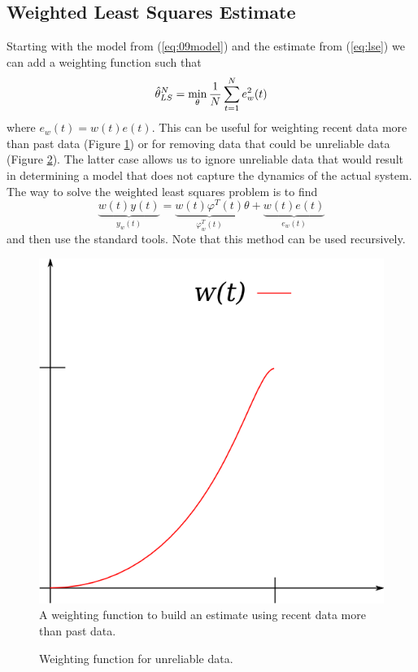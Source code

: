 \subsection{Weighted Least Squares Estimate}
Starting with the model from (\ref{eq:09model}) and the estimate from (\ref{eq:lse}) we can add a weighting function such that
$$\hat{\theta}_{LS}^N = \min_\theta \frac{1}{N}\sum_{t=1}^N e_w^2(t)$$
where $e_w(t)=w(t)e(t)$. This can be useful for weighting recent data more than past data (Figure \ref{fig:09wRecent}) or for removing data that could be unreliable data (Figure \ref{fig:09bad}). The latter case allows us to ignore unreliable data that would result in determining a model that does not capture the dynamics of the actual system. The way to solve the weighted least squares problem is to find
$$\underbrace{w(t)y(t)}_{y_w(t)} = \underbrace{w(t)\varphi^T(t)}_{\varphi_w^T(t)}\theta + \underbrace{w(t)e(t)}_{e_w(t)}$$
and then use the standard tools. Note that this method can be used recursively.

\begin{figure}[ht!]
  \centering
  \includegraphics[width=.25\textwidth]{images/09wRecent}
  \caption{A weighting function to build an estimate using recent data more than past data.}
  \label{fig:09wRecent}
\end{figure}

\begin{figure}[ht!]
  \centering
   \hfill
   \hfill
  \caption{Weighting function for unreliable data.}
  \label{fig:09bad}
\end{figure}

